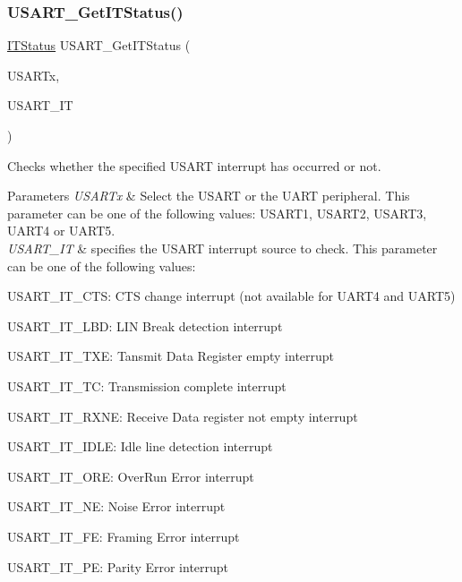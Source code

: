 \subsubsection{\texorpdfstring{U\+S\+A\+R\+T\+\_\+\+Get\+I\+T\+Status()}{USART\_GetITStatus()}}
{\footnotesize\ttfamily \hyperlink{group___exported__types_gaacbd7ed539db0aacd973a0f6eca34074}{I\+T\+Status} U\+S\+A\+R\+T\+\_\+\+Get\+I\+T\+Status (\begin{DoxyParamCaption}\item[{\hyperlink{struct_u_s_a_r_t___type_def}{U\+S\+A\+R\+T\+\_\+\+Type\+Def} $\ast$}]{U\+S\+A\+R\+Tx,  }\item[{uint16\+\_\+t}]{U\+S\+A\+R\+T\+\_\+\+IT }\end{DoxyParamCaption})}



Checks whether the specified U\+S\+A\+RT interrupt has occurred or not. 


\begin{DoxyParams}{Parameters}
{\em U\+S\+A\+R\+Tx} & Select the U\+S\+A\+RT or the U\+A\+RT peripheral. This parameter can be one of the following values\+: U\+S\+A\+R\+T1, U\+S\+A\+R\+T2, U\+S\+A\+R\+T3, U\+A\+R\+T4 or U\+A\+R\+T5. \\
\hline
{\em U\+S\+A\+R\+T\+\_\+\+IT} & specifies the U\+S\+A\+RT interrupt source to check. This parameter can be one of the following values\+: \begin{DoxyItemize}
\item U\+S\+A\+R\+T\+\_\+\+I\+T\+\_\+\+C\+TS\+: C\+TS change interrupt (not available for U\+A\+R\+T4 and U\+A\+R\+T5) \item U\+S\+A\+R\+T\+\_\+\+I\+T\+\_\+\+L\+BD\+: L\+IN Break detection interrupt \item U\+S\+A\+R\+T\+\_\+\+I\+T\+\_\+\+T\+XE\+: Tansmit Data Register empty interrupt \item U\+S\+A\+R\+T\+\_\+\+I\+T\+\_\+\+TC\+: Transmission complete interrupt \item U\+S\+A\+R\+T\+\_\+\+I\+T\+\_\+\+R\+X\+NE\+: Receive Data register not empty interrupt \item U\+S\+A\+R\+T\+\_\+\+I\+T\+\_\+\+I\+D\+LE\+: Idle line detection interrupt \item U\+S\+A\+R\+T\+\_\+\+I\+T\+\_\+\+O\+RE\+: Over\+Run Error interrupt \item U\+S\+A\+R\+T\+\_\+\+I\+T\+\_\+\+NE\+: Noise Error interrupt \item U\+S\+A\+R\+T\+\_\+\+I\+T\+\_\+\+FE\+: Framing Error interrupt \item U\+S\+A\+R\+T\+\_\+\+I\+T\+\_\+\+PE\+: Parity Error interrupt \end{DoxyItemize}
\\
\hline
\end{DoxyParams}


